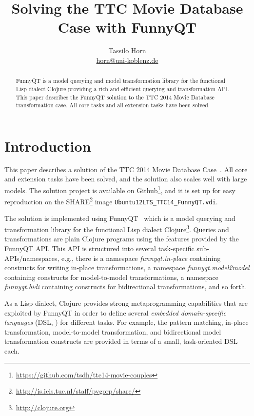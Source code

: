 \documentclass[a4paper]{article}
\title{Solving the TTC Movie Database Case with FunnyQT}
\author{Tassilo Horn\\
  \href{mailto:horn@uni-koblenz.de}{horn@uni-koblenz.de}}
\begin{document}
\maketitle

\begin{abstract}
  FunnyQT is a model querying and model transformation library for the
  functional Lisp-dialect Clojure providing a rich and efficient querying and
  transformation API.  This paper describes the FunnyQT solution to the TTC
  2014 Movie Database transformation case.  All core tasks and all extension
  tasks have been solved.
\end{abstract}


\section{Introduction}
\label{sec:introduction}

This paper describes a solution of the TTC 2014 Movie Database
Case~\cite{movies-case-desc}.  All core and extension tasks have been solved,
and the solution also scales well with large models.  The solution project is
available on
Github\footnote{\url{https://github.com/tsdh/ttc14-movie-couples}}, and it is
set up for easy reproduction on the
SHARE\footnote{\url{http://is.ieis.tue.nl/staff/pvgorp/share/}} image
\texttt{Ubuntu12LTS\_TTC14\_FunnyQT.vdi}.

The solution is implemented using FunnyQT~\cite{Horn2013MQWFQ} which is a model
querying and transformation library for the functional Lisp dialect
Clojure\footnote{\url{http://clojure.org}}.  Queries and transformations are
plain Clojure programs using the features provided by the FunnyQT API.  This
API is structured into several task-specific sub-APIs/namespaces, e.g., there
is a namespace \emph{funnyqt.in-place} containing constructs for writing
in-place transformations, a namespace \emph{funnyqt.model2model} containing
constructs for model-to-model transformations, a namespace \emph{funnyqt.bidi}
containing constructs for bidirectional transformations, and so forth.

As a Lisp dialect, Clojure provides strong metaprogramming capabilities that
are exploited by FunnyQT in order to define several \emph{embedded
  domain-specific languages} (DSL, \cite{book:Fowler2010DSL}) for different
tasks.  For example, the pattern matching, in-place transformation,
model-to-model transformation, and bidirectional model transformation
constructs are provided in terms of a small, task-oriented DSL each.
\end{document}

